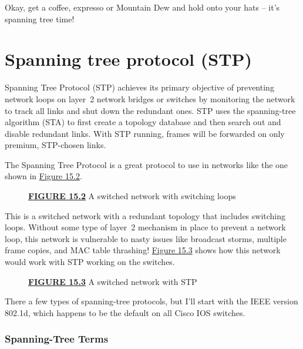 \documentclass[b5paper,11pt]{memoir}
\begin{document}
Okay, get a coffee, expresso or Mountain Dew and hold onto your
hats -- it's spanning tree time!

\section{Spanning tree protocol (STP)}

Spanning Tree Protocol (STP) achieves its primary objective of
preventing network loops on layer~2 network bridges or switches by
monitoring the network to track all links and shut down the redundant
ones. STP uses the spanning-tree algorithm (STA) to first create a
topology database and then search out and disable redundant links. With
STP running, frames will be forwarded on only premium, STP-chosen links.

The Spanning Tree Protocol is a great protocol to use in networks like
the one shown in \protect\hyperlink{c15.xhtmlux5cux23figure15-2}{Figure
15.2}.



\begin{figure}
\centering
\caption{{\protect\hyperlink{c15.xhtmlux5cux23figureanchor15-2}{\textbf{FIGURE
15.2}} A switched network with switching loops}}
\end{figure}

This is a switched network with a redundant topology that includes
switching loops. Without some type of layer~2 mechanism in place to
prevent a network loop, this network is vulnerable to nasty issues like
broadcast storms, multiple frame copies, and MAC table thrashing!
\protect\hyperlink{c15.xhtmlux5cux23figure15-3}{Figure 15.3} shows how
this network would work with STP working on the switches.

\begin{figure}
\centering
\caption{{\protect\hyperlink{c15.xhtmlux5cux23figureanchor15-3}{\textbf{FIGURE
15.3}} A switched network with STP}}
\end{figure}

There a few types of spanning-tree protocols, but I'll start with the IEEE version 802.1d, which happens to be the default on all Cisco IOS switches.

\subsubsection[Spanning-Tree
Terms]{\texorpdfstring{\protect\hypertarget{c15.xhtmlux5cux23c15-sec-10}{}{}Spanning-Tree
Terms}{Spanning-Tree Terms}}
\end{document}
